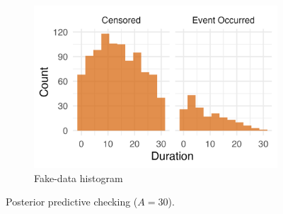 \begin{figure}[htbp]
\begin{subfigure}[t]{0.35\textwidth}
  \centering
  \includegraphics[width=\linewidth]{images/fake_duration_hist_a30.png}   %
  \caption{Fake-data histogram}
  \label{fig:fake-hist_a30}
\end{subfigure}
\caption{Posterior predictive checking ($A=30$).}
\label{fig:ppc-A30}
\end{figure}
